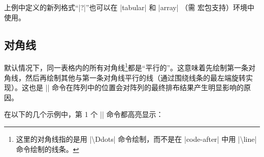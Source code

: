 \documentclass[dvipsnames]{article}%
\begin{document}
\bigskip
上例中定义的新列格式“|?|”也可以在 |{tabular}| 和
|{array}| （需  宏包支持）环境中使用。

\subsection{对角线} 
\label{zm:对角线}
\label{parallelization}

默认情况下，同一表格内的所有对角线\footnote{这里的对角线指的是用 |\textbackslash Ddots| 命令绘制，而不是在 |code-after| 中用 |\textbackslash line| 命令绘制的线条。}都是“平行的”。这意味着先绘制第一条对角线，然后再绘制其他与第一条对角线平行的线（通过围绕线条的最左端旋转实现）。这也是 |\Ddots| 命令在阵列中的位置会对阵列的最终排布结果产生明显影响的原因。

\medskip
在以下的几个示例中，第 1 个 |\Ddots| 命令都高亮显示：
\end{document}

